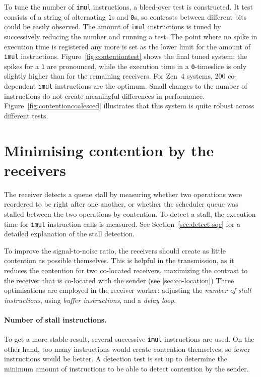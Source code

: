 \documentclass[11pt,
  titlepage=false,
  parskip=half,      %
]{scrreprt}
\begin{document}
To tune the number of \texttt{imul} instructions, a bleed-over test is constructed.
It test consists of a string of alternating \texttt{1}s and \texttt{0}s, so contrasts between different bits could be easily observed.
The amount of \texttt{imul} instructions is tuned by successively reducing the number and running a test.
The point where no spike in execution time is registered any more is set as the lower limit for the amount of \texttt{imul} instructions.
Figure~\ref{fig:contentiontest} shows the final tuned system;
the spikes for a \texttt{1} are pronounced, while the execution time in a \texttt{0}-timeslice is only slightly higher than for the remaining receivers.
For Zen~4 systems, 200 co-dependent \texttt{imul} instructions are the optimum.
Small changes to the number of instructions do not create meaningful differences in performance.
Figure~\ref{fig:contentioncoalesced} illustrates that this system is quite robust across different tests.

\section{Minimising contention by the receivers}
\label{sec:reducecontention}
The receiver detects a queue stall by measuring whether two operations were reordered to be right after one another,
or whether the scheduler queue was stalled between the two operations by contention.
To detect a stall, the execution time for \texttt{imul} instruction calls is measured.
See Section~\ref{sec:detect-sqc} for a detailed explanation of the stall detection.

To improve the signal-to-noise ratio, the receivers should create as little contention as possible themselves.
This is helpful in the transmission, as it reduces the contention for two co-located receivers,
maximizing the contrast to the receiver that is co-located with the sender (see \ref{sec:co-location})
Three optimisations are employed in the receiver worker: adjusting the \textit{number of stall instructions},
using \textit{buffer instructions}, and a \textit{delay loop}.

\paragraph{Number of stall instructions.}
To get a more stable result, several successive \texttt{imul} instructions are used.
On the other hand, too many instructions would create contention themselves, so fewer instructions would be better.
A detection test is set up to determine the minimum amount of instructions to be able to detect contention by the sender.
\end{document}
